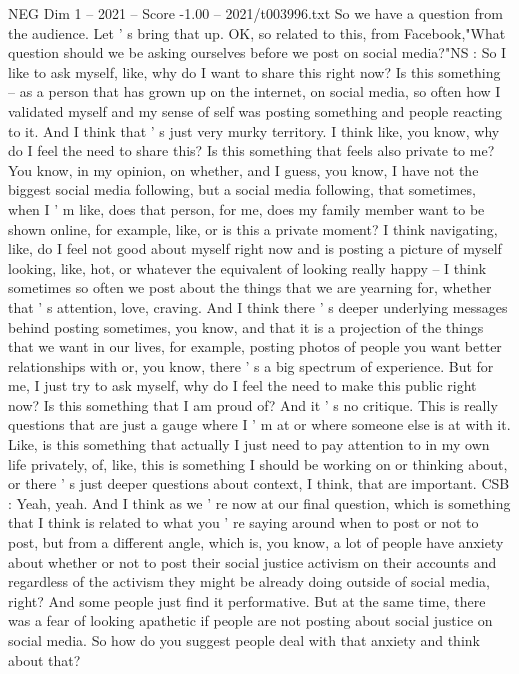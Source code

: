 \begin{textsample}{NEG Dim 1 – 2021 – Score -1.00 – 2021/t003996.txt}
So we have a question from the audience.
Let ' s bring that up.
OK, so related to this, from Facebook,"What question should we be asking ourselves before we post on social media?"NS : So I like to ask myself, like, why do I want to share this right now?
Is this something -- as a person that has grown up on the internet, on social media, so often how I validated myself and my sense of self was posting something and people reacting to it.
And I think that ' s just very murky territory.
I think like, you know, why do I feel the need to share this?
Is this something that feels also private to me?
You know, in my opinion, on whether, and I guess, you know, I have not the biggest social media following, but a social media following, that sometimes, when I ' m like, does that person, for me, does my family member want to be shown online, for example, like, or is this a private moment?
I think navigating, like, do I feel not good about myself right now and is posting a picture of myself looking, like, hot, or whatever the equivalent of looking really happy -- I think sometimes so often we post about the things that we are yearning for, whether that ' s attention, love, craving.
And I think there ' s deeper underlying messages behind posting sometimes, you know, and that it is a projection of the things that we want in our lives, for example, posting photos of people you want better relationships with or, you know, there ' s a big spectrum of experience.
But for me, I just try to ask myself, why do I feel the need to make this public right now?
Is this something that I am proud of?
And it ' s no critique.
This is really questions that are just a gauge where I ' m at or where someone else is at with it.
Like, is this something that actually I just need to pay attention to in my own life privately, of, like, this is something I should be working on or thinking about, or there ' s just deeper questions about context, I think, that are important.
CSB : Yeah, yeah.
And I think as we ' re now at our final question, which is something that I think is related to what you ' re saying around when to post or not to post, but from a different angle, which is, you know, a lot of people have anxiety about whether or not to post their social justice activism on their accounts and regardless of the activism they might be already doing outside of social media, right?
And some people just find it performative.
But at the same time, there was a fear of looking apathetic if people are not posting about social justice on social media.
So how do you suggest people deal with that anxiety and think about that?

\end{textsample}
